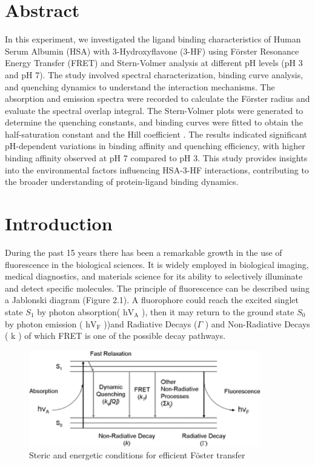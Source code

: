 \documentclass[a4paper,english,12pt,bibliography=totoc]{scrreprt}
\begin{document}
\chapter{Abstract}
In this experiment, we investigated the ligand binding characteristics of Human Serum Albumin (HSA) with 3-Hydroxyflavone (3-HF) using Förster Resonance Energy Transfer (FRET) and Stern-Volmer analysis at different pH levels (pH 3 and pH 7). The study involved spectral characterization, binding curve analysis, and quenching dynamics to understand the interaction mechanisms. The absorption and emission spectra were recorded to calculate the Förster radius and evaluate the spectral overlap integral. The Stern-Volmer plots were generated to determine the quenching constants, and binding curves were fitted to obtain the half-saturation constant  and the Hill coefficient . The results indicated significant pH-dependent variations in binding affinity and quenching efficiency, with higher binding affinity observed at pH 7 compared to pH 3. This study provides insights into the environmental factors influencing HSA-3-HF interactions, contributing to the broader understanding of protein-ligand binding dynamics.
\label{cha:Abstract}

\chapter{Introduction}
\label{cha:Introduction}
During the past 15 years there has been a remarkable growth in the use of fluorescence in the biological sciences. It is widely employed in biological imaging, medical diagnostics, and materials science for its ability to selectively illuminate and detect specific molecules. The principle of fluorescence can be described using a Jablonski diagram (Figure 2.1). A fluorophore could reach the excited singlet state $S_1$ by photon absorption( $\mathrm{hV_A}$ ), then it may return to the ground state $S_0$ by photon emission ( $\mathrm{hV_F}$ ))and Radiative Decays ($\Gamma$ ) and Non-Radiative Decays ( k ) of which FRET is one of the possible decay pathways. 
\begin{figure}[H]
        \centering
        \includegraphics[width=0.9\textwidth]{Figures/A-simplified-Jablonski-diagram-illustrating-the-fluorescence-process-Photons-that-are(1).png}
	    \caption{Steric and energetic conditions for efficient Föster transfer}
\end{figure}
\end{document}
